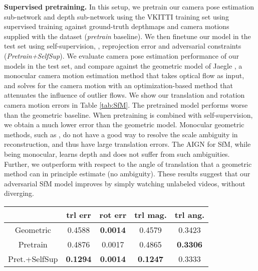 \documentclass[10pt,twocolumn,letterpaper]{article}
\begin{document}
\begin{bibunit}[ieee]
\textbf{Supervised pretraining.}
In this setup, we pretrain our camera pose estimation sub-network and depth sub-network using the VKITTI training set using  supervised training against ground-truth depthmaps and camera motions supplied with the dataset (\textit{pretrain} baseline).  We then  finetune our model in the test set using self-supervision, \ie, reprojection error and adversarial constraints  (\textit{Pretrain+SelfSup}). 
We  evaluate camera pose estimation performance of our models in the test set, and compare against the geometric model of Jaegle \etal\cite{DBLP:conf/icra/JaeglePD16}, a monocular camera motion estimation method that takes optical flow as input, and solves for the camera motion with an optimization-based method that attenuates the influence of outlier flows. %
We show  our translation and rotation camera motion errors in Table \ref{tab:SfM}.  The pretrained model performs worse than the geometric baseline. When pretraining is combined with self-supervision, we obtain a much lower error than the geometric model.  Monocular geometric methods, such as \cite{DBLP:conf/icra/JaeglePD16}, do not have a good way to resolve the scale ambiguity in reconstruction, and thus have large translation errors. The AIGN for SfM, while being monocular, learns depth and does not suffer from such ambiguities. Further, we outperform \cite{DBLP:conf/icra/JaeglePD16} with respect to the angle of translation that a geometric method can in principle estimate (no ambiguity). 
These results suggest that our adversarial SfM model  improves by simply watching unlabeled videos, without diverging. 
\centering
\begin{tabular}{c c c c c}
 \hline
 & trl err & rot err & trl mag. & trl ang.  \\
 \hline
 Geometric \cite{DBLP:conf/icra/JaeglePD16} & 0.4588 & \textbf{0.0014} & 0.4579 & 0.3423 \\
 Pretrain  & 0.4876 & 0.0017 & 0.4865 & \textbf{0.3306} \\
 Pret.+SelfSup & \textbf{0.1294} & \textbf{0.0014} & \textbf{0.1247} & 0.3333 \\
 \hline

\end{tabular}
\end{bibunit}
\end{document}
